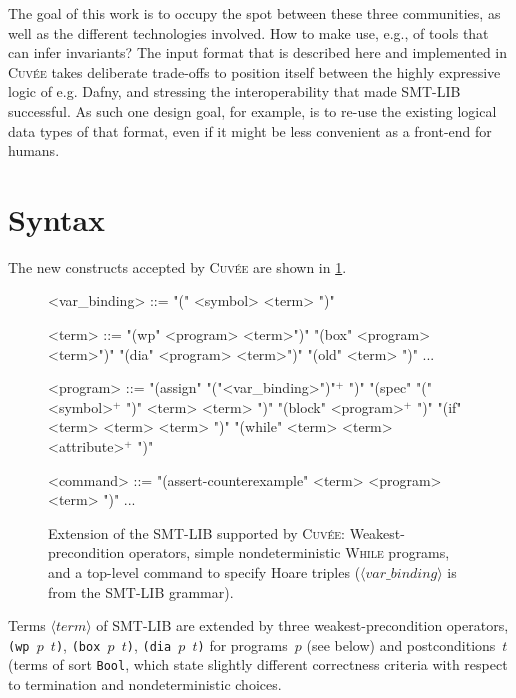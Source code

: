 \documentclass[fleqn]{llncs}
\newcommand{\Cuvee}{\textsc{Cuvée}\xspace}
\newcommand{\code}[1]{\texttt{#1}}
\newcommand{\nonterminal}[1]{\ensuremath{\langle \mathit{#1} \rangle}}
\begin{document}
The goal of this work is to occupy the spot between these three communities,
as well as the different technologies involved.
How to make use, e.g., of tools that can infer invariants?
The input format that is described here and implemented in \Cuvee takes deliberate trade-offs
to position itself between the highly expressive logic of e.g. Dafny,
and stressing the interoperability that made SMT-LIB successful.
As such one design goal, for example, is to re-use the existing logical data types of that format,
even if it might be less convenient as a front-end for humans.



\section{Syntax}
\label{sec:syntax}

The new constructs accepted by \Cuvee are shown in \cref{fig:syntax}.

\begin{figure}[t]
    \begin{grammar}
    <var_binding>
        ::= "(" <symbol> <term> ")"

    <term>
        ::=  "(wp" <program> <term>")"
        \alt "(box" <program> <term>")"
        \alt "(dia" <program> <term>")"
        \alt "(old" <term> ")"
        \alt ...

    <program>
        ::=  "(assign" "("<var_binding>")"$^+$ ")"
        \alt "(spec"   "(" <symbol>$^+$ ")" <term> <term> ")"
        \alt "(block"  <program>$^+$ ")"
        \alt "(if"     <term> <term> <term> ")"
        \alt "(while"  <term> <term> <attribute>$^+$ ")"

    <command>
        ::=  "(assert-counterexample" <term> <program> <term> ")"
        \alt ...
    \end{grammar}
    \caption{Extension of the SMT-LIB supported by \Cuvee:
             Weakest-precondition operators,
             simple nondeterministic \textsc{While} programs,
             and a top-level command to specify Hoare triples
             (\nonterminal{var\_binding} is from the SMT-LIB grammar).}
    \label{fig:syntax}
\end{figure}

Terms \nonterminal{term} of SMT-LIB are extended by three weakest-precondition operators,
\code{(wp  $p$ $t$)}, \code{(box $p$ $t$)}, \code{(dia $p$ $t$)}
for programs~$p$ (see below)
and postconditions~$t$ (terms of sort \code{Bool},
which state slightly different correctness criteria with respect to termination and nondeterministic choices.
\end{document}
